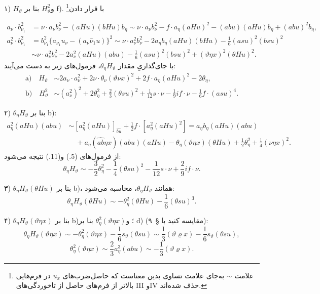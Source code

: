 \documentclass[11pt]{article}
\providecommand{\R}{\varrho}
\newcommand{\srcLTR}[1]{\relax\ifmmode\text{\mbox{\babelsublr{\foreignlanguage{english}{#1}}}}\else\babelsublr{\foreignlanguage{english}{#1}}\fi}
\newcommand{\srcfn}[2]{\begingroup\renewcommand{\thefootnote}{\srcLTR{#1}}\footnote{#2}\addtocounter{footnote}{-1}\endgroup}
\begin{document}
\noindent ۱) $H_\vartheta$ و$H_\vartheta^2$ بنا بر f). با قرار دادن\srcfn{*)}{علامت $\sim$ به‌جای علامت تساوی بدین معناست که حاصل‌ضرب‌های $u_x$ در فرم‌هایی بالاتر از فرم‌های حاصل از تاخوردگی‌های III وIV حذف شده‌اند.}
\[
\begin{aligned}
a_\nu\cdot b_{\nu_1}^2
&=\nu\cdot a_\nu b_\nu^2-(aHu)(bHu)b_\eta
\sim \nu\cdot a_\nu b_\nu^2-f\cdot a_\eta(aHu)^2-(abu)(aHu)b_\eta+(abu)^2b_\eta,\\
a_\nu^2\cdot b_{\nu_1}^2
&=b_{\nu_1}^2\{a_{\nu_1}u_\nu-(a_\nu\widehat{\nu}_1u)\}^2
\sim \nu\cdot a_\nu^2b_\nu^2-2a_\eta b_\eta(aHu)(bHu)-\frac16(asu)^2(bsu)^2\\
&\sim \nu\cdot a_\nu^2b_\nu^2-2a_\nu^2(aHu)(abu)-\frac16(asu)^2(bsu)^2+(\vartheta\eta x)^2(\theta Hu)^2.
\end{aligned}
\]
با جای‌گذاریِ مقدار $\theta_\eta H_\vartheta$، فرمول‌های زیر به دست می‌آیند:
\[
\tag{12}
\begin{aligned}
\text{a)}\quad H_\vartheta&\sim 2a_\nu\cdot a_\nu^2+2\nu\cdot\theta_\nu(\vartheta\nu x)^2+2f\cdot a_\eta(aHu)^2-2\theta_\eta,\\
\text{b)}\quad H_\vartheta^2&\sim (a_\nu^2)^2+2\theta_\eta^2+\frac23(\theta su)^2+\frac1{12}s\cdot\nu-\frac19 i f\cdot\nu-\frac16f\cdot(asu)^4.
\end{aligned}
\]

\noindent ۲) $\theta_\eta H_\vartheta$ بنا بر b):
\[
\begin{aligned}
a_\eta^2(aHu)(abu)
&\sim [a_\eta^2(aHu)]_{\widehat{bu}}+\frac12 f\cdot[a_\eta^2(aHu)^2]
=a_\eta b_\eta(aHu)(abu)\\
&\quad+a_\eta(\widehat{ab}\eta x)(abu)(aHu)-\theta_\eta(\vartheta\eta x)(\theta Hu)+\frac12\theta_\eta^2+\frac14(\nu\eta x)^2.
\end{aligned}
\]
از فرمول‌های (5.) و(11.) نتیجه می‌شود:
\[
\theta_\eta H_\vartheta\sim-\frac32\theta_\eta^2-\frac14(\theta su)^2-\frac1{12}s\cdot\nu+\frac29 i f\cdot\nu.
\]

\noindent ۳) $\theta_\eta H_\vartheta(\theta Hu)$ بنا بر b)، همانند $\theta_\eta H_\vartheta$، محاسبه می‌شود:
\[
\theta_\eta H_\vartheta(\theta Hu)\sim-\theta_\eta^2(\theta Hu)-\frac16(\theta su)^3.
\]

\noindent ۴) $\theta_\eta H_\vartheta(\vartheta\eta x)$ بنا بر b)؛ و$\theta_\eta^2(\vartheta\eta x)$ بنا بر d) (مقایسه کنید با \S\ ۹):
\[
\theta_\eta H_\vartheta(\vartheta\eta x)\sim-\theta_\eta^2(\vartheta\eta x)-\frac16s_\vartheta(\theta su)
\sim\frac13(\vartheta\R x)-\frac16s_\vartheta(\theta su),
\]
\[
\theta_\eta^2(\vartheta\eta x)\sim\frac23a_\eta^3(abu)\sim-\frac13(\vartheta\R x).
\]
\end{document}
